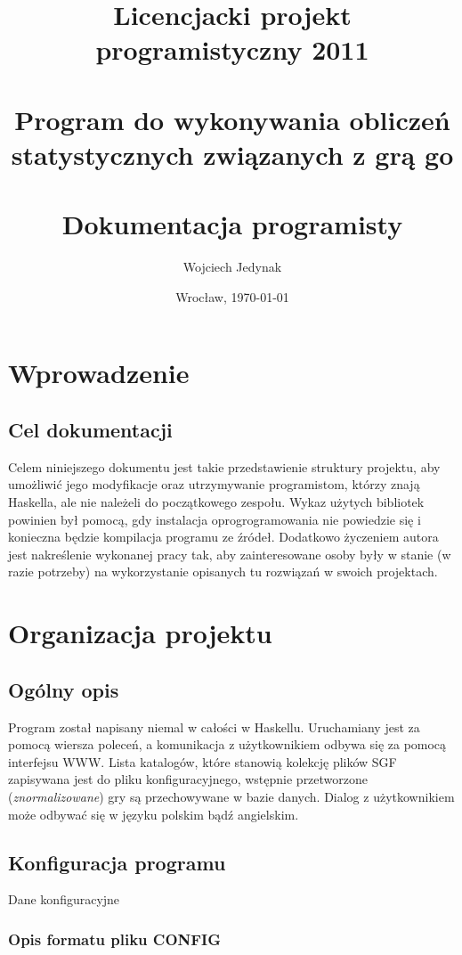 \documentclass[11pt,leqno]{article}
\title{\LARGE Licencjacki projekt programistyczny 2011 \\ 
       \ \\
       Program do wykonywania obliczeń statystycznych związanych z grą go \\ 
       \ \\
       Dokumentacja programisty }
\author{Wojciech Jedynak}
\date{Wrocław, \today}
\begin{document}
\maketitle 

\thispagestyle{empty}
\tableofcontents

\newpage

\section{Wprowadzenie}

\subsection{Cel dokumentacji}
Celem niniejszego dokumentu jest takie przedstawienie struktury projektu, aby umożliwić jego modyfikacje oraz utrzymywanie programistom, którzy
znają Haskella, ale nie należeli do początkowego zespołu. Wykaz użytych bibliotek powinien był pomocą, gdy instalacja oprogrogramowania nie powiedzie się i 
konieczna będzie kompilacja programu ze źródeł. Dodatkowo życzeniem autora jest nakreślenie wykonanej pracy tak, aby zainteresowane osoby
były w stanie (w razie potrzeby) na wykorzystanie opisanych tu rozwiązań w swoich projektach.

\section{Organizacja projektu}

\subsection{Ogólny opis}
Program został napisany niemal w całości w Haskellu. Uruchamiany jest za pomocą wiersza poleceń, a komunikacja z użytkownikiem
odbywa się za pomocą interfejsu WWW. Lista katalogów, które stanowią kolekcję plików SGF zapisywana jest do pliku konfiguracyjnego,
wstępnie przetworzone (\emph{znormalizowane}) gry są przechowywane w bazie danych. Dialog z użytkownikiem może odbywać się w języku
polskim bądź angielskim.

\subsection{Konfiguracja programu}

Dane konfiguracyjne

\subsubsection{Opis formatu pliku CONFIG}
\end{document}
